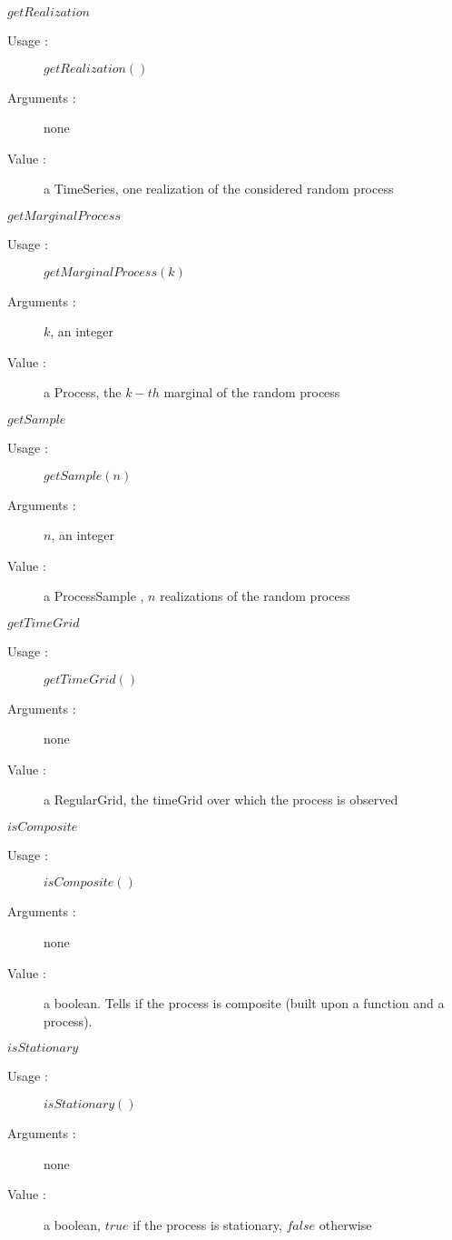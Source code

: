 \begin{description}
\begin{description}
  \item $getRealization$
    \begin{description}
    \item[Usage :] $getRealization()$
    \item[Arguments :] none
    \item[Value :] a TimeSeries, one realization of the considered random process
    \end{description}
    \bigskip

 \item $getMarginalProcess$
    \begin{description}
    \item[Usage :] $getMarginalProcess(k)$
    \item[Arguments :] $k$, an integer
    \item[Value :] a Process, the $k-th$ marginal of the random process
    \end{description}
    \bigskip

  \item $getSample$
    \begin{description}
    \item[Usage :] $getSample(n)$
    \item[Arguments :] $n$, an integer
    \item[Value :] a ProcessSample , $n$ realizations of the random process
    \end{description}
    \bigskip

  \item $getTimeGrid$
    \begin{description}
    \item[Usage :] $getTimeGrid()$
    \item[Arguments :] none
    \item[Value :] a RegularGrid, the timeGrid over which the process is observed
    \end{description}
    \bigskip

 \item $isComposite$
    \begin{description}
    \item[Usage :] $isComposite()$
    \item[Arguments :] none
    \item[Value :] a boolean. Tells if the process is composite (built upon a function and a process).
    \end{description}
    \bigskip

 \item $isStationary$
    \begin{description}
    \item[Usage :] $isStationary()$
    \item[Arguments :] none
    \item[Value :] a boolean, $true$ if the process is stationary, $false$ otherwise
    \end{description}
    \bigskip


\end{description}
\end{description}
